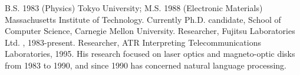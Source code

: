 \begin{biography}
{
B.S. 1983 (Physics)\hspace{0.2mm} Tokyo\hspace{0.2mm} University;\hspace{0.2mm} M.S. 1988
(Electronic Materials) Massachusetts Institute of Technology.
Currently Ph.D. candidate, School of Computer Science, Carnegie Mellon
University. Researcher, Fujitsu Laboratories Ltd. , 1983-present.
Researcher, ATR Interpreting Telecommunications Laboratories, 1995.
His research focused on laser optics and magneto-optic disks from 1983
to 1990, and since 1990 has concerned natural language processing.
}



\end{biography}


